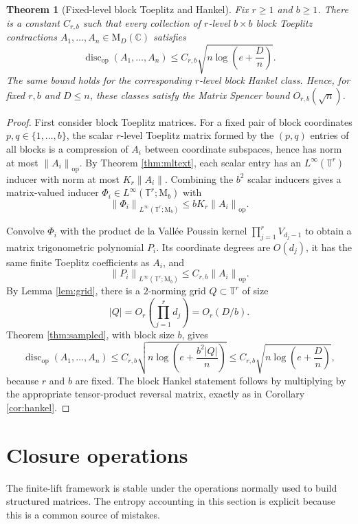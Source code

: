 \documentclass[11pt]{amsart}
\numberwithin{equation}{section}
\newtheorem{theorem}{Theorem}[section]
\theoremstyle{definition}
\theoremstyle{remark}
\newcommand{\C}{\mathbb C}
\newcommand{\T}{\mathbb T}
\newcommand{\M}{\mathrm M}
\newcommand{\op}{\mathrm{op}}
\newcommand{\discop}{\operatorname{disc}_{\op}}
\newcommand{\norm}[1]{\left\lVert #1\right\rVert}
\begin{document}
\begin{theorem}[Fixed-level block Toeplitz and Hankel]\label{thm:blocktoep}
Fix $r\ge 1$ and $b\ge 1$. There is a constant $C_{r,b}$ such that every
collection of $r$-level $b\times b$ block Toeplitz contractions
$A_1,\ldots,A_n\in\M_D(\C)$ satisfies
\[
\discop(A_1,\ldots,A_n)
\le C_{r,b}\sqrt{n\log\left(e+\frac{D}{n}\right)} .
\]
The same bound holds for the corresponding $r$-level block Hankel class. Hence,
for fixed $r,b$ and $D\le n$, these classes satisfy the Matrix Spencer bound
$O_{r,b}(\sqrt n)$.
\end{theorem}

\begin{proof}
First consider block Toeplitz matrices. For a fixed pair of block coordinates
$p,q\in\{1,\ldots,b\}$, the scalar $r$-level Toeplitz matrix formed by the
$(p,q)$ entries of all blocks is a compression of $A_i$ between coordinate
subspaces, hence has norm at most $\norm{A_i}_{\op}$. By Theorem
\ref{thm:mltext}, each scalar entry has an $L^\infty(\T^r)$ inducer
with norm at most $K_r\norm{A_i}$. Combining the $b^2$ scalar inducers gives a
matrix-valued inducer $\Phi_i\in L^\infty(\T^r;\M_b)$ with
\[
\norm{\Phi_i}_{L^\infty(\T^r;\M_b)}\le bK_r\norm{A_i}_{\op} .
\]

Convolve $\Phi_i$ with the product de la Vall\'ee Poussin kernel
$\prod_{j=1}^r V_{d_j-1}$ to obtain a matrix trigonometric polynomial $P_i$.
Its coordinate degrees are $O(d_j)$, it has the same finite Toeplitz
coefficients as $A_i$, and
\[
\norm{P_i}_{L^\infty(\T^r;\M_b)}\le C_{r,b}\norm{A_i}_{\op} .
\]
By Lemma \ref{lem:grid}, there is a $2$-norming grid
$Q\subset\T^r$ of size
\[
|Q|=O_r\left(\prod_{j=1}^r d_j\right)=O_r(D/b).
\]
Theorem \ref{thm:sampled}, with block size $b$, gives
\[
\discop(A_1,\ldots,A_n)
\le C_{r,b}\sqrt{n\log\left(e+\frac{b^2|Q|}{n}\right)}
\le C_{r,b}\sqrt{n\log\left(e+\frac{D}{n}\right)},
\]
because $r$ and $b$ are fixed. The block Hankel statement follows by multiplying
by the appropriate tensor-product reversal matrix, exactly as in Corollary
\ref{cor:hankel}.
\end{proof}

\section{Closure operations}

The finite-lift framework is stable under the operations normally used to build
structured matrices. The entropy accounting in this section is explicit because
this is a common source of mistakes.
\end{document}
